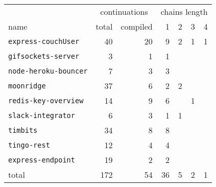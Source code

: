 \begin{tabular}{l r r r r r r }
                                      & \multicolumn{2}{c}{continuations}      & \multicolumn{4}{c}{chains length}\\
name                                  & total              & compiled          & 1  & 2 & 3 & 4 \\
\hline
\texttt{express-couchUser}            & 40                 & 20                & 9  & 2 & 1 & 1 \\
\texttt{gifsockets-server}            & 3                  & 1                 & 1  &           \\ 
\texttt{node-heroku-bouncer}          & 7                  & 3                 & 3  &           \\
\texttt{moonridge}                    & 37                 & 6                 & 2  & 2         \\
\texttt{redis-key-overview}           & 14                 & 9                 & 6  &   & 1     \\
\texttt{slack-integrator}             & 6                  & 3                 & 1  & 1         \\
\texttt{timbits}                      & 34                 & 8                 & 8              \\
\texttt{tingo-rest}                   & 12                 & 4                 & 4              \\
\texttt{express-endpoint}             & 19                 & 2                 & 2              \\
\hline
total                                 & 172                & 54                & 36 & 5 & 2 & 1 \\
\end{tabular}






